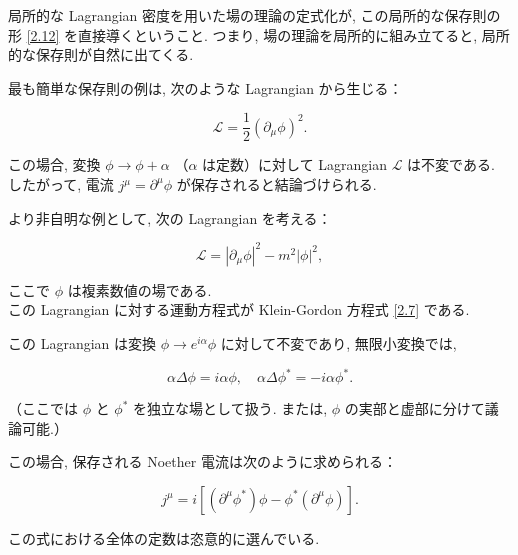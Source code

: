 \documentclass[a4paper,12pt]{article}
\begin{document}
\color{black}

局所的な Lagrangian 密度を用いた場の理論の定式化が, この局所的な保存則の形 \eqref{2.12} を直接導くということ. つまり, 場の理論を局所的に組み立てると, 局所的な保存則が自然に出てくる.\par
最も簡単な保存則の例は, 次のような Lagrangian から生じる：

\begin{equation*}
\mathcal{L} = \frac{1}{2} (\partial_\mu \phi)^2.
\end{equation*}

この場合, 変換 $\phi \to \phi + \alpha$ （$\alpha$ は定数）に対して Lagrangian $\mathcal{L}$ は不変である. したがって, 電流 $j^\mu = \partial^\mu \phi$ が保存されると結論づけられる.\par
より非自明な例として, 次の Lagrangian を考える：

\begin{equation*}
\mathcal{L} = |\partial_\mu \phi|^2 - m^2 |\phi|^2,
\tag{2.14}
\end{equation*}

ここで $\phi$ は複素数値の場である.\\
この Lagrangian に対する運動方程式が Klein-Gordon 方程式 \eqref{2.7} である.\par
この Lagrangian は変換 $\phi \to e^{i\alpha} \phi$ に対して不変であり, 無限小変換では,

\begin{equation}
\alpha \Delta \phi = i\alpha \phi, \quad \alpha \Delta \phi^* = -i\alpha \phi^*.
\tag{2.15}
\end{equation}

\noindent（ここでは $\phi$ と $\phi^*$ を独立な場として扱う. または, $\phi$ の実部と虚部に分けて議論可能.）

この場合, 保存される Noether 電流は次のように求められる：

\begin{equation*}\label{2.16}
j^\mu = i \left[ (\partial^\mu \phi^*) \phi - \phi^* (\partial^\mu \phi) \right]. \tag{2.16}
\end{equation*}

この式における全体の定数は恣意的に選んでいる.

\color{blue}
\end{document}
